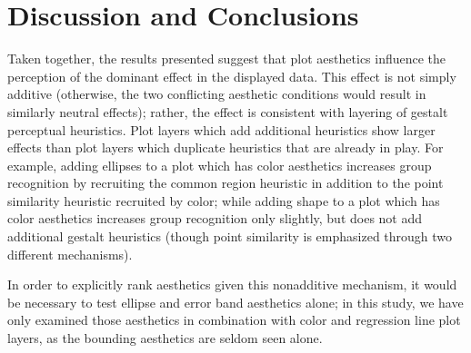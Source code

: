 \documentclass[12pt]{article}\usepackage[]{graphicx}\usepackage[]{color}
\begin{document}


\section{Discussion and Conclusions}\label{sec:Conclusion}

Taken together, the results presented suggest that plot aesthetics influence the perception of the dominant effect in the displayed data. This effect is not simply additive (otherwise, the two conflicting aesthetic conditions would result in similarly neutral effects); rather, the effect is consistent with layering of gestalt perceptual heuristics. Plot layers which add additional heuristics show larger effects than plot layers which duplicate heuristics that are already in play. For example, adding ellipses to a plot which has color aesthetics increases group recognition by recruiting the common region heuristic in addition to the point similarity heuristic recruited by color; while adding shape to a plot which has color aesthetics increases group recognition only slightly, but does not add additional gestalt heuristics (though point similarity is emphasized through two different mechanisms). 

In order to explicitly rank aesthetics given this nonadditive mechanism, it would be necessary to test ellipse and error band aesthetics alone; in this study, we have only examined those aesthetics in combination with color and regression line plot layers, as the bounding aesthetics are seldom seen alone. 
\end{document}
